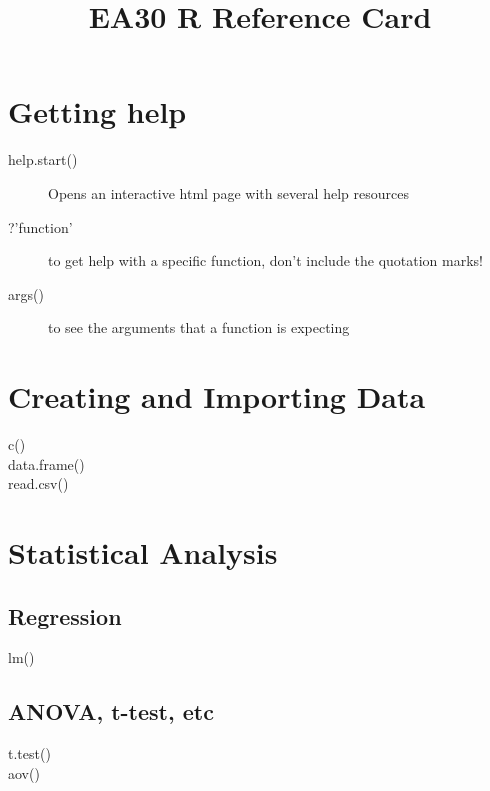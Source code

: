 \documentclass{article}
\title{EA30 R Reference Card}
\begin{document}

\maketitle

\begin{multicols}{3}


\section*{Getting help}

\begin{description}
  \item[help.start()] Opens an interactive html page with several help resources
  \item[?'function'] to get help with a specific function, don't include the quotation marks!
  \item[args()] to see the arguments that a function is expecting
\end{description}

\section*{Creating and Importing Data}

\begin{description}
\item[c()]
\item[data.frame()]
\item[read.csv()]
\end{description}

\section*{Statistical Analysis}

\subsection*{Regression}

\begin{description}
\item[lm()] 
\end{description}

\subsection*{ANOVA, t-test, etc}

\begin{description}
\item[t.test()]
\item[aov()]
\end{description}


\end{multicols}
\end{document}
